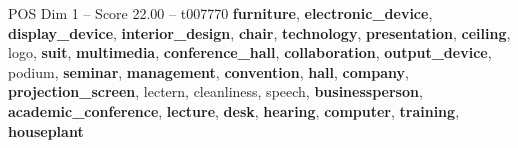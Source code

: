 \begin{textsample}{POS Dim 1 – Score 22.00 – t007770}  \label{ex:f1_pos_038}
\textbf{furniture}, \textbf{electronic\_device}, \textbf{display\_device}, \textbf{interior\_design}, \textbf{chair}, \textbf{technology}, \textbf{presentation}, \textbf{ceiling}, logo, \textbf{suit}, \textbf{multimedia}, \textbf{conference\_hall}, \textbf{collaboration}, \textbf{output\_device}, podium, \textbf{seminar}, \textbf{management}, \textbf{convention}, \textbf{hall}, \textbf{company}, \textbf{projection\_screen}, lectern, cleanliness, speech, \textbf{businessperson}, \textbf{academic\_conference}, \textbf{lecture}, \textbf{desk}, \textbf{hearing}, \textbf{computer}, \textbf{training}, \textbf{houseplant}

\end{textsample}
